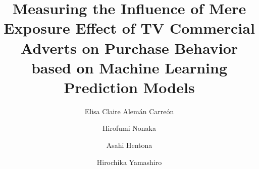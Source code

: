 \documentclass[review]{elsarticle}
\providecommand{\DIFdelbegin}{} %
\begin{document}
\begin{frontmatter}

\title{Measuring the Influence of Mere Exposure Effect of TV Commercial Adverts on Purchase Behavior based on Machine Learning Prediction Models}

\author[gidai]{Elisa Claire Alemán Carreón
}

\author[gidai]{Hirofumi Nonaka}

\author[gidai]{Asahi Hentona}

\author[gidai]{Hirochika Yamashiro}

\address[gidai]{Nagaoka University of Technology, Nagaoka, Japan}




\begin{abstract}
\DIFdelbegin %


\end{abstract}
\end{frontmatter}
\end{document}
